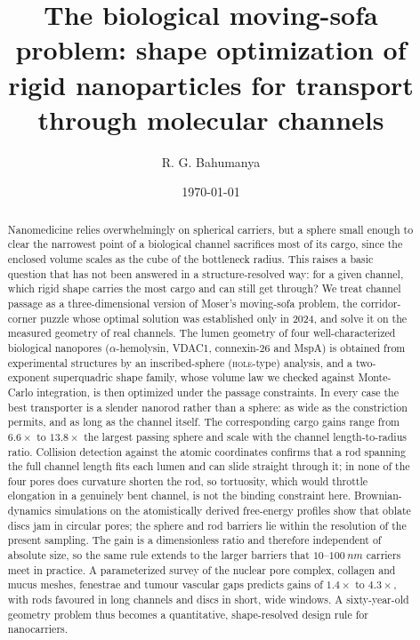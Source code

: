 \documentclass[aps,pre,twocolumn,superscriptaddress,floatfix,nofootinbib]{revtex4-2}
\begin{document}
\title{The biological moving-sofa problem: shape optimization of rigid
nanoparticles for transport through molecular channels}

\author{R. G. Bahumanya}

\date{\today}

\begin{abstract}
Nanomedicine relies overwhelmingly on spherical carriers, but a sphere small
enough to clear the narrowest point of a biological channel sacrifices most of
its cargo, since the enclosed volume scales as the cube of the bottleneck radius.
This raises a basic question that has not been answered in a structure-resolved
way: for a given channel, which rigid shape carries the most cargo and can still
get through? We treat channel passage as a three-dimensional version of Moser's
moving-sofa problem, the corridor-corner puzzle whose optimal solution was
established only in 2024, and solve it on the measured geometry of real channels.
The lumen geometry of four well-characterized biological nanopores
($\alpha$-hemolysin, VDAC1, connexin-26 and MspA) is obtained from experimental
structures by an inscribed-sphere (\textsc{hole}-type) analysis, and a
two-exponent superquadric shape family, whose volume law we checked against
Monte-Carlo integration, is then optimized under the passage constraints. In
every case the best transporter is a slender nanorod rather than a sphere: as
wide as the constriction permits, and as long as the channel itself. The
corresponding cargo gains range from $6.6\times$ to $13.8\times$ the largest
passing sphere and scale with the channel length-to-radius ratio. Collision
detection against the atomic coordinates confirms that a rod spanning the full
channel length fits each lumen and can slide straight through it; in none of the
four pores does curvature shorten the rod, so tortuosity, which would throttle
elongation in a genuinely bent channel, is not the binding constraint here.
Brownian-dynamics simulations on the atomistically derived free-energy profiles
show that oblate discs jam in circular pores; the sphere and rod barriers lie
within the resolution of the present sampling. The gain is a dimensionless ratio and therefore
independent of absolute size, so the same rule extends to the larger barriers
that $10$--$\SI{100}{nm}$ carriers meet in practice. A parameterized survey of
the nuclear pore complex, collagen and mucus meshes, fenestrae and tumour
vascular gaps predicts gains of $1.4\times$ to $4.3\times$, with rods favoured in
long channels and discs in short, wide windows. A sixty-year-old geometry problem
thus becomes a quantitative, shape-resolved design rule for nanocarriers.
\end{abstract}
\end{document}
